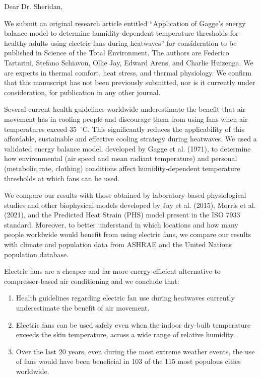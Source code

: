 \documentclass[11pt,a4paper,roman]{moderncv}        %
\begin{document}
\date{\today}
\opening{Dear Dr. Sheridan,}

\makelettertitle

We submit an original research article entitled ``Application of Gagge's energy balance model to determine humidity-dependent temperature thresholds for healthy adults using electric fans during heatwaves'' for consideration to be published in Science of the Total Environment.
The authors are Federico Tartarini, Stefano Schiavon, Ollie Jay, Edward Arens, and Charlie Huizenga.
We are experts in thermal comfort, heat stress, and thermal physiology.
We confirm that this manuscript has not been previously submitted, nor is it currently under consideration, for publication in any other journal.

Several current health guidelines worldwide underestimate the benefit that air movement has in cooling people and discourage them from using fans when air temperatures exceed 35~$^{\circ}$C.
This significantly reduces the applicability of this affordable, sustainable and effective cooling strategy during heatwaves.
We used a validated energy balance model, developed by Gagge et al. (1971), to determine how environmental (air speed and mean radiant temperature) and personal (metabolic rate, clothing) conditions affect humidity-dependent temperature thresholds at which fans can be used.

We compare our results with those obtained by laboratory-based physiological studies and other biophysical models developed by Jay et al. (2015), Morris et al. (2021), and the Predicted Heat Strain (PHS) model present in the ISO 7933 standard. Moreover, to better understand in which locations and how many people worldwide would benefit from using electric fans, we compare our results with climate and population data from ASHRAE and the United Nations population database.

Electric fans are a cheaper and far more energy-efficient alternative to compressor-based air conditioning and we conclude that:
\begin{enumerate}[itemindent=.5cm,nolistsep]
    \item Health guidelines regarding electric fan use during heatwaves currently underestimate the benefit of air movement.
    \item Electric fans can be used safely even when the indoor dry-bulb temperature exceeds the skin temperature, across a wide range of relative humidity.
    \item Over the last 20 years, even during the most extreme weather events, the use of fans would have been beneficial in 103 of the 115 most populous cities worldwide.
\end{enumerate}
\end{document}

